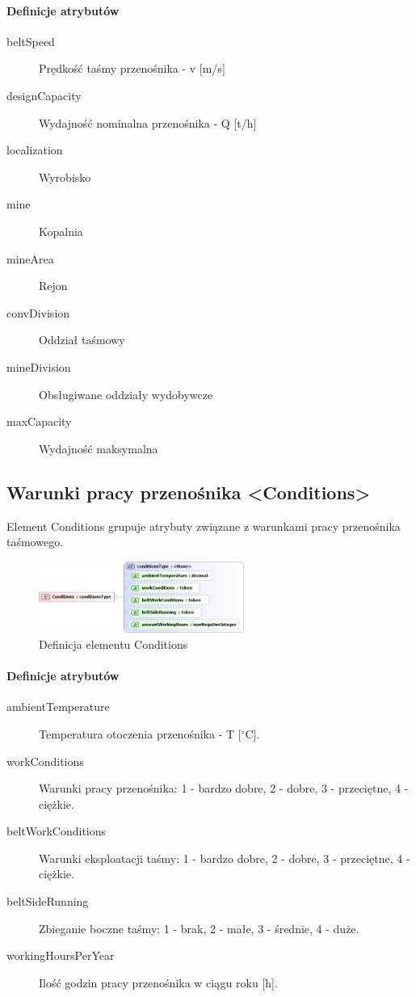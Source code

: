\documentclass[12pt,a4paper]{article}
\begin{document}
\paragraph{Definicje atrybutów}
\begin{description}
\item[beltSpeed] Prędkość taśmy przenośnika - v [m/s]
\item[designCapacity] Wydajność nominalna przenośnika - Q [t/h]
\item[localization] Wyrobisko
\item[mine] Kopalnia
\item[mineArea] Rejon
\item[convDivision] Oddział taśmowy
\item[mineDivision] Obsługiwane oddziały wydobywcze
\item[maxCapacity] Wydajność maksymalna
\end{description}


\subsection{Warunki pracy przenośnika <Conditions>}
Element Conditions grupuje atrybuty związane z warunkami pracy przenośnika
taśmowego.

\begin{figure}[h]
  \centering
  \includegraphics[width=0.6\textwidth]{png/conditions_xsd2}
  \caption{Definicja elementu Conditions}
  \label{fig:conditions-xsd}
\end{figure}

\paragraph{Definicje atrybutów}
\begin{description}
\item[ambientTemperature] Temperatura otoczenia przenośnika - T [$^\circ$C].
\item[workConditions] Warunki pracy przenośnika: 1 - bardzo dobre, 2 - dobre,
  3 - przeciętne, 4 - ciężkie.
\item[beltWorkConditions] Warunki eksploatacji taśmy: 1 - bardzo dobre,
  2 - dobre, 3 - przeciętne, 4 - ciężkie.
\item[beltSideRunning] Zbieganie boczne taśmy: 1 - brak, 2 - małe, 3 - średnie,
  4 - duże.
\item[workingHoursPerYear] Ilość godzin pracy przenośnika w ciągu roku [h].
\end{description}
\end{document}
